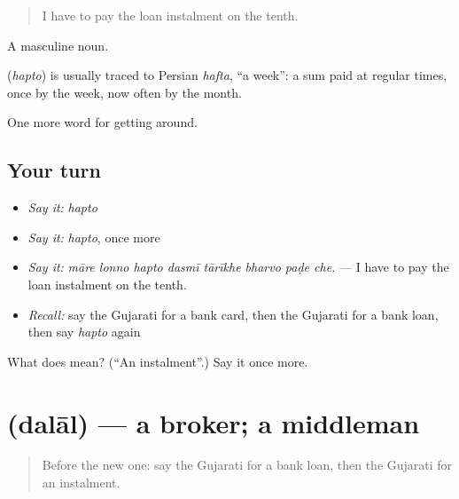 \begin{quote}
I have to pay the loan instalment on the tenth.
\end{quote}

A masculine noun.

\begin{cousinweb}
\textbf{} (\emph{hapto}) is usually traced to Persian \emph{hafta}, \textquotedblleft{}a week\textquotedblright{}: a sum paid at regular times, once by the week, now often by the month.
\end{cousinweb}

\begin{grammarlens}[title={What you've built}]
One more word for getting around.
\end{grammarlens}

\subsection*{Your turn}
\begin{itemize}
\raggedright
  \item \emph{Say it:} \emph{hapto}
  \item \emph{Say it:} \emph{hapto}, once more
  \item \emph{Say it:} \emph{māre lonno hapto dasmī tārīkhe bharvo paḍe che.} — I have to pay the loan instalment on the tenth.
  \item \emph{Recall:} say the Gujarati for a bank card, then the Gujarati for a bank loan, then say \emph{hapto} again
\end{itemize}

\begin{tcolorbox}[breakable,colback=teal!4,colframe=teal!35!black,title={Before you move on}]
What does  mean? (\textquotedblleft{}An instalment\textquotedblright{}.) Say it once more.
\end{tcolorbox}
\section[\texorpdfstring{\gu{દલાલ} (dalāl)}{દલાલ (dalāl)}]{ (dalāl) — a broker; a middleman}

\label{lesson:GU-C425-dalal}



\begin{quote}
Before the new one: say the Gujarati for a bank loan, then the Gujarati for an instalment.
\end{quote}

